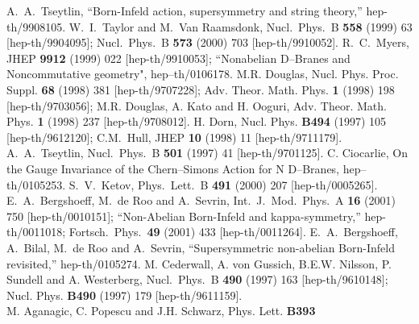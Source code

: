 \documentclass[a4paper,12pt]{article}
\begin{document}
\begin{thebibliography}{999}
A.~A.~Tseytlin, ``Born-Infeld action, supersymmetry and string
theory,'' hep-th/9908105.
W.~I.~Taylor and M.~Van Raamsdonk, Nucl.\ Phys.\ B {\bf 558}
(1999) 63 [hep-th/9904095];
Nucl.\ Phys.\ B {\bf 573} (2000) 703 [hep-th/9910052].
R.~C.~Myers,
JHEP {\bf 9912} (1999) 022 [hep-th/9910053];
``Nonabelian D--Branes and Noncommutative geometry",
hep--th/0106178.
{M.R. Douglas, Nucl. Phys. Proc. Suppl. {\bf 68} (1998)
381 [hep-th/9707228]; Adv. Theor. Math. Phys. {\bf 1} (1998) 198
[hep-th/9703056]; M.R. Douglas, A. Kato and H. Ooguri, Adv. Theor.
Math. Phys. {\bf 1} (1998) 237 [hep-th/9708012].}
H. Dorn, Nucl. Phys. {\bf B494} (1997) 105 [hep-th/9612120];
C.M.~Hull, JHEP {\bf 10} (1998) 11 [hep-th/9711179].
A.~A.~Tseytlin,
Nucl.\ Phys.\ B {\bf 501} (1997) 41 [hep-th/9701125].
C. Ciocarlie, On the Gauge Invariance of the Chern--Simons Action
for N D--Branes, hep--th/0105253.
S.~V.~Ketov,
Phys.\ Lett.\ B {\bf 491} (2000) 207 [hep-th/0005265].
E.~A.~Bergshoeff, M.~de Roo and A.~Sevrin,
Int.\ J.\ Mod.\ Phys.\ A {\bf 16} (2001) 750 [hep-th/0010151];
``Non-Abelian Born-Infeld and kappa-symmetry,'' hep-th/0011018;
Fortsch.\ Phys.\  {\bf 49} (2001) 433 [hep-th/0011264].
E.~A.~Bergshoeff, A.~Bilal, M.~de Roo and A.~Sevrin,
``Supersymmetric non-abelian Born-Infeld revisited,''
hep-th/0105274.
M. Cederwall, A. von Gussich, B.E.W. Nilsson, P. Sundell and A.
Westerberg, Nucl.\ Phys.\ B {\bf 490} (1997) 163 [hep-th/9610148];
Nucl. Phys. {\bf B490} (1997) 179 [hep-th/9611159].\\
M. Aganagic, C. Popescu and J.H. Schwarz, Phys. Lett. {\bf B393}

\end{thebibliography}
\end{document}
